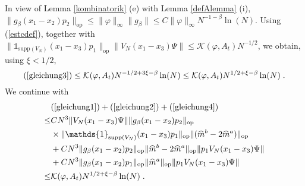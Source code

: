 \documentclass[11pt, english, american]{article}
\renewcommand{\phi}{\varphi}
\begin{document}
In view of Lemma \ref{kombinatorik} (e) with Lemma \ref{defAlemma} (i),  $\|g_{\beta}(x_{1}-x_{2})p_2\|_{\text{op}} \leq \|\phi\|_\infty \| g_\beta \| \leq C  \|\phi\|_\infty  N^{-1-\beta} \ln(N) $.
Using (\ref{estcdef}), together with 
$ \|\mathds{1}_{\text{supp}(V_N)}(x_1-x_3)p_1\|_{\text{op}}  \|V_N(x_1-x_3)\Psi\|\leq  \mathcal{K}(\phi, A_t) N^{-1/2}$, 
 we obtain, using $\xi <1/2$,
$$(\ref{gleichung3})\leq   \mathcal{K}(\phi,A_t) N^{-1/2+3\xi-\beta}\ln(N)
\leq   \mathcal{K}(\phi,A_t) N^{1/2+\xi-\beta}\ln(N)
\;.$$
We continue with
\begin{align*}
&(\ref{gleichung1})+(\ref{gleichung2})+(\ref{gleichung4})\\\leq&
C N^3\|V_N(x_1-x_3)\Psi\|\|g_{\beta}(x_{1}-x_{2})p_2\|_{\text{op}}
\\ & \times \|\mathds{1}_{\text{supp}(V_N)}(x_1-x_3)p_1\|_{\text{op}}\|
(\widehat{m}^b-2\widehat{m}^a)\|_{\text{op}}
%
\\&+C N^3\|g_{\beta}(x_{1}-x_{2})p_2\|_{\text{op}}
\|\widehat{m}^b-2\widehat{m}^a\|_{\text{op}}\|p_{1}V_N(x_1-x_3) \Psi\|
%
\\&+C N^3\|g_{\beta}(x_{1}-x_{2})p_1\|_{\text{op}}\|
\widehat{m}^a\|_{\text{op}}\|p_{1} V_N(x_1-x_3)\Psi\|
%
\\\leq &   \mathcal{K}(\phi,A_t) N^{1/2+\xi-\beta} \ln(N)
\;.
\end{align*}
\end{document}
